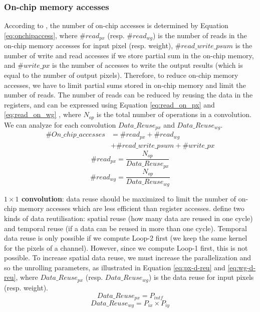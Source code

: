 \subsubsection{On-chip memory accesses}
%
According to \textcite{ma_optimizing_2018}, the number of on-chip accesses is determined by Equation \eqref{eq:onchipaccess}, where $\#read_{px}$ (resp. $\#read_{wg}$) is the number of reads in the on-chip memory accesses for input pixel (resp. weight), $\#read\_write\_psum$ is the number of write and read accesses if we store partial sum in the on-chip memory, and  $\#write\_px$ is the number of accesses to write the output results (which is equal to the number of output pixels). Therefore, to reduce on-chip memory accesses, we have to limit partial sums stored in on-chip memory and limit the number of reads.
The number of reads can be reduced by reusing the data in the registers, and can be expressed using Equation \ref{eq:read_on_px} and \ref{eq:read_on_wg} \cite{ma_optimizing_2018}, where $N_{op}$ is the total number of operations in a convolution. We can analyze for each convolution $Data\_Reuse_{px}$ and $Data\_Reuse_{wg}$.
%
\begin{align}
    \#On\_chip\_accesses &= \#read_{px} + \#read_{wg} \\ &+ \#read\_write\_psum + \#write\_px
    \label{eq:onchipaccess}
\end{align}
%
\begin{equation}
    \#read_{px} = \frac{N_{op}}{Data\_Reuse_{px}}
    \label{eq:read_on_px}
\end{equation}
%
\begin{equation}
    \#read_{wg} = \frac{N_{op}}{Data\_Reuse_{wg}}
    \label{eq:read_on_wg}
\end{equation}

\textbf{$1 \times 1$ convolution}: data reuse should be maximized to limit the number of on-chip memory accesses which are less efficient than register accesses. \textcite{ma_optimizing_2018} define two kinds of data reutilisation: spatial reuse (how many data are reused in one cycle) and temporal reuse (if a data can be reused in more than one cycle). Temporal data reuse is only possible if we compute Loop-2 first (we keep the same kernel for the pixels of a channel). However, since we compute Loop-1 first, this is not possible. To increase spatial data reuse, we must increase the parallelization and so the unrolling parameters, as illustrated in Equation \eqref{eq:px-d-reu} and \eqref{eq:wg-d-reu}, where $Data\_Reuse_{px}$ (resp. $Data\_Reuse_{wg}$) is the data reuse for input pixels (resp. weight).
%
\begin{equation}
    Data\_Reuse_{px} = P_{intf}
    \label{eq:px-d-reu}
\end{equation}
\begin{equation}
    Data\_Reuse_{wg} = P_{ix} \times P_{iy}
    \label{eq:wg-d-reu}
\end{equation}

